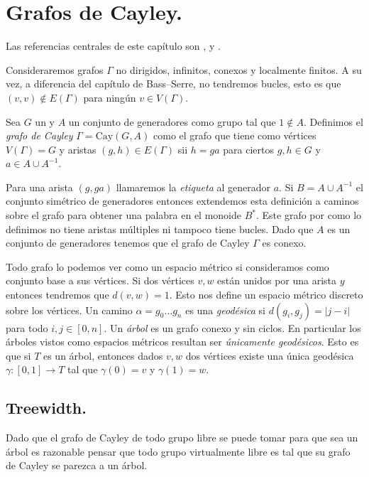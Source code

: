 \documentclass[tesis.tex]{subfiles}
\begin{document}
	
\chapter{Grafos de Cayley.} \label{seccion_treewidth}

Las referencias centrales de este capítulo son \cite{diekert2017context}, \cite{kuske2005logical} y \cite{diestel2005graph}.


Consideraremos grafos $\Gamma$ no dirigidos, infinitos, conexos y localmente finitos.
A su vez, a diferencia del capítulo de Bass--Serre, no tendremos bucles, esto es que $(v,v) \notin E(\Gamma)$ para ningún $v \in V(\Gamma)$.

\begin{deff}
	Sea $G$ un \fg y $A$ un conjunto de generadores como grupo tal que $1 \notin A$.
	Definimos el \emph{grafo de Cayley} $\Gamma = \text{Cay}(G,A)$ como el grafo que tiene como vértices $V(\Gamma) = G$ y aristas $(g,h) \in E(\Gamma)$ sii $h=ga$ para ciertos $g,h \in G$ y $a \in A \cup A^{-1}$. 
\end{deff}

Para una arista $(g,ga)$ llamaremos la \emph{etiqueta} al generador $a$.
Si $B = A \cup A^{-1}$ el conjunto simétrico de generadores entonces extendemos esta definición a caminos sobre el grafo para obtener una palabra en el monoide $B^*$.
Este grafo por como lo definimos no tiene aristas múltiples ni tampoco tiene bucles.
Dado que $A$ es un conjunto de generadores tenemos que el grafo de Cayley $\Gamma$ es conexo.

Todo grafo lo podemos ver como un espacio métrico si consideramos como conjunto base a sus vértices. 
Si dos vértices $v,w$ están unidos por una arista $y$ entonces tendremos que $d(v,w)=1$.
Esto nos define un espacio métrico discreto sobre los vértices. 
Un camino $\alpha = g_0 \dots g_n$ es una \emph{geodésica} si $d(g_i,g_j) = |j-i|$ para todo $i,j \in [0,n]$.
Un \emph{árbol} es un grafo conexo y sin ciclos. 
En particular los árboles vistos como espacios métricos resultan ser \emph{únicamente geodésicos}. 
Esto es que si $T$ es un árbol, entonces dados $v,w$ dos vértices existe una única geodésica $\gamma:[0,1] \to T$ tal que $\gamma(0)=v$ y $\gamma(1)=w$.


\section{Treewidth.}

Dado que el grafo de Cayley de todo grupo libre se puede tomar para que sea un árbol es razonable pensar que todo grupo virtualmente libre es tal que su grafo de Cayley se parezca a un árbol. 
\end{document}

